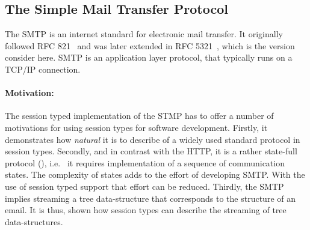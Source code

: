 
\subsection{The Simple Mail Transfer Protocol}

The SMTP is an internet standard for electronic
mail transfer. It originally followed
RFC 821~\cite{SMTP-rfc} and was later extended
in RFC 5321~\cite{ESMTP-rfc}, which is the version consider here.
SMTP is an application layer protocol, that typically runs on
a TCP/IP connection.

\paragraph{Motivation:}
The session typed implementation of the STMP has to offer
a number of motivations for using session types for software
development.
Firstly, it demonstrates how {\em natural} it is
to describe of a widely used standard protocol in session types.
Secondly, and in contrast with the HTTP, it is
a rather state-full protocol (),
i.e.~ it requires implementation of a sequence of communication states.
The complexity of states adds to the effort of
developing SMTP. With the use of session typed
support that effort can be reduced.
Thirdly, the SMTP implies streaming a tree
data-structure that corresponds to the structure
of an email.
It is thus, shown how session types can describe
the streaming of tree data-structures.


%
%

